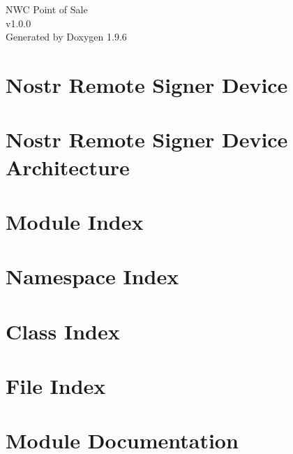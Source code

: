 \documentclass[twoside]{book}
\newcommand{\+}{\discretionary{\mbox{\scriptsize$\hookleftarrow$}}{}{}}
\newcommand{\clearemptydoublepage}{%
    \newpage{\pagestyle{empty}\cleardoublepage}%
  }
\begin{document}
  \raggedbottom
    \hypersetup{pageanchor=false,
                bookmarksnumbered=true,
                pdfencoding=unicode
               }
  \begin{titlepage}
  \vspace*{7cm}
  \begin{center}%
  {\Large NWC Point of Sale}\\
  [1ex]\large v1.\+0.\+0 \\
  \vspace*{1cm}
  {\large Generated by Doxygen 1.9.6}\\
  \end{center}
  \end{titlepage}
  \clearemptydoublepage
  \tableofcontents
  \clearemptydoublepage
  \hypersetup{pageanchor=true}
\chapter{Nostr Remote Signer Device}
\label{index}\hypertarget{index}{}
\chapter{Nostr Remote Signer Device Architecture}
\label{md__a_r_c_h_i_t_e_c_t_u_r_e}

\chapter{Module Index}

\chapter{Namespace Index}

\chapter{Class Index}

\chapter{File Index}

\chapter{Module Documentation}



\end{document}
